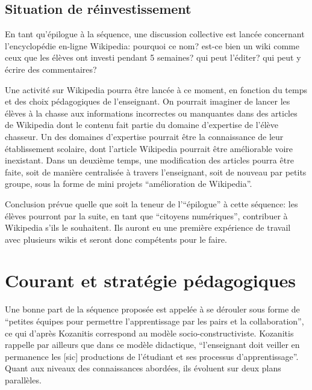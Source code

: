 \documentclass[11pt,bibliography=totoc]{scrartcl}
\begin{document}
\subsection{Situation de réinvestissement}
En tant qu'épilogue à la séquence, une discussion collective est lancée
concernant l'encyclopédie en-ligne Wikipedia: pourquoi ce nom? est-ce bien un
wiki comme ceux que les élèves ont investi pendant 5 semaines? qui peut
l'éditer? qui peut y écrire des commentaires?

Une activité sur Wikipedia pourra être lancée à ce moment, en fonction du temps
et des choix pédagogiques de l'enseignant.  On pourrait imaginer de lancer les
élèves à la chasse aux informations incorrectes ou manquantes dans des articles
de Wikipedia dont le contenu fait partie du domaine d'expertise de l'élève
chasseur. Un des domaines d'expertise pourrait être la connaissance de leur
établissement scolaire, dont l'article Wikipedia pourrait être améliorable voire
inexistant.  Dans un deuxième temps, une modification des articles pourra être
faite, soit de manière centralisée à travers l'enseignant, soit de nouveau par
petits groupe, sous la forme de mini projets ``amélioration de Wikipedia''.

Conclusion prévue quelle que soit la teneur de l'``épilogue'' à cette séquence:
les élèves pourront par la suite, en tant que ``citoyens numériques'',
contribuer à Wikipedia s'ils le souhaitent. Ils auront eu une première
expérience de travail avec plusieurs wikis et seront donc compétents pour le
faire.

\section{Courant et stratégie pédagogiques}
Une bonne part de la séquence proposée est appelée à se dérouler sous forme de
``petites équipes pour permettre l'apprentissage par les pairs et la
collaboration'', ce qui d'après Kozanitis \cite{kozanitis} correspond au modèle
socio-constructiviste. Kozanitis rappelle par ailleurs que dans ce modèle
didactique, ``l'enseignant doit veiller en permanence les [sic] productions de
l'étudiant et ses processus d'apprentissage''.
Quant aux niveaux des connaissances abordées, ils évoluent sur deux plans
parallèles.
\end{document}
